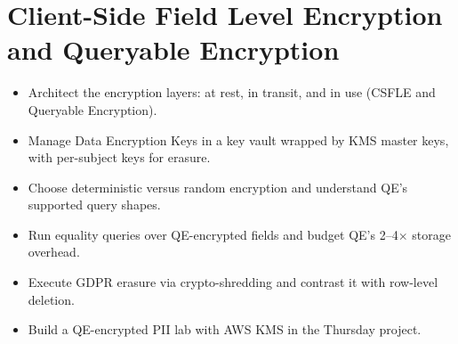 \chapter{Client-Side Field Level Encryption and Queryable Encryption}
%

\begin{objectives}
\begin{itemize}
    \item Architect the encryption layers: at rest, in transit, and in use (CSFLE and Queryable Encryption).
    \item Manage Data Encryption Keys in a key vault wrapped by KMS master keys, with per-subject keys for erasure.
    \item Choose deterministic versus random encryption and understand QE's supported query shapes.
    \item Run equality queries over QE-encrypted fields and budget QE's 2--4$\times$ storage overhead.
    \item Execute GDPR erasure via crypto-shredding and contrast it with row-level deletion.
    \item Build a QE-encrypted PII lab with AWS KMS in the Thursday project.
\end{itemize}
\end{objectives}

